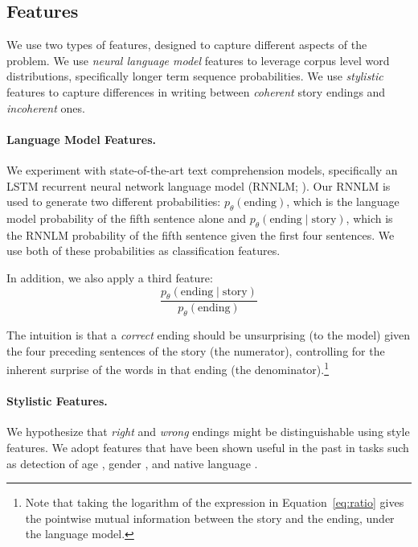\documentclass[11pt]{article}
\begin{document}
\subsection{Features}
We use two types of features, designed to capture different aspects of the problem. 
We use \textit{neural language model} features to leverage corpus level word distributions, specifically longer term sequence probabilities.
We use \textit{stylistic} features to capture differences in writing between {\it coherent} story endings and {\it incoherent} ones. 


\paragraph{Language Model Features.}
We experiment with state-of-the-art text comprehension models, specifically an LSTM \cite{hochreiter1997long} recurrent neural network language model (RNNLM; ).
Our RNNLM is used to generate two different probabilities:
$p_\theta(\textrm{ending})$, which is the language model probability of the fifth sentence alone and $p_\theta(\textrm{ending} \mid \textrm{story})$, which is the RNNLM probability of the fifth sentence given the first four sentences.  
We use both of these probabilities as classification features.

In addition, we also apply a third feature:
\begin{equation}
\frac{p_\theta(\textrm{ending} \mid
  \textrm{story})}{p_\theta(\textrm{ending})} \label{eq:ratio}
\end{equation}

The intuition is that a \emph{correct} ending should be unsurprising (to the model) given the four preceding sentences of the story (the numerator), controlling for the inherent surprise of the words in that ending (the denominator).\footnote{Note that taking the logarithm of
the expression in Equation~\ref{eq:ratio} gives the pointwise mutual information between the story and the ending, under the language model.}

\paragraph{Stylistic Features.}
We hypothesize that {\it right} and {\it wrong} endings might be distinguishable using style features.
We adopt features that have been shown useful in the past in tasks such as detection of age \cite{Schler:2006,Rosenthal:2011,nguyen:2011:latech}, gender  \cite{Argamon:2003,Schler:2006,bamman2014gender}, and native language
\cite{Koppel:2005,Tsur:2007,Bergsma:2012}.
\end{document}
